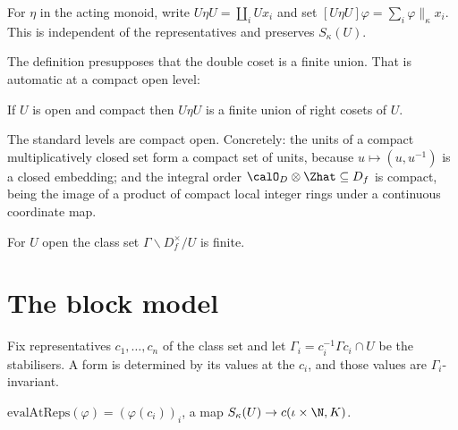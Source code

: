 \begin{definition}
  \label{def:heckeoperator}
  \leanok
  For $\eta$ in the acting monoid, write $U \eta U = \coprod_i U x_i$ and set $[U\eta U]\varphi =
  \sum_i \varphi \|_\kappa x_i$.  This is independent of the representatives and preserves
  $S_\kappa(U)$.
\end{definition}

The definition presupposes that the double coset is a finite union.  That is automatic at a
compact open level:

\begin{theorem}
  \label{thm:hecke-finiteness}
  \leanok
  If $U$ is open and compact then $U \eta U$ is a finite union of right cosets of $U$.
\end{theorem}

\begin{proposition}
  \label{prop:compact-open-levels}
  \leanok
  The standard levels are compact open.  Concretely: the units of a compact multiplicatively
  closed set form a compact set of units, because $u \mapsto (u, u^{-1})$ is a closed embedding;
  and the integral order $\calO_D \otimes \Zhat \subseteq D_f$ is compact, being the image of a
  product of compact local integer rings under a continuous coordinate map.
\end{proposition}

\begin{theorem}[Fujisaki]
  \label{thm:fujisaki}
  \leanok
  For $U$ open the class set $\Gamma \backslash D_f^\times / U$ is finite.
\end{theorem}

\section{The block model}

Fix representatives $c_1, \dots, c_n$ of the class set and let $\Gamma_i = c_i^{-1}\Gamma c_i
\cap U$ be the stabilisers.  A form is determined by its values at the $c_i$, and those values
are $\Gamma_i$-invariant.

\begin{definition}
  \label{def:evalatreps}
  \leanok
  $\mathrm{evalAtReps}(\varphi) = (\varphi(c_i))_i$, a map $S_\kappa(U) \to c(\iota \times \N,
  K)$.
\end{definition}

